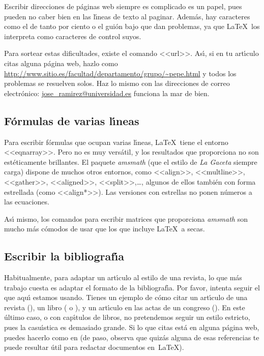 \documentclass[autocontact]{gaceta}
\begin{document}
Escribir direcciones de p\'aginas web siempre es complicado es un papel, pues pueden no caber bien en las l\'{\i}neas de texto al paginar. Adem\'as, hay caracteres como el de tanto por ciento o el gui\'on bajo que dan problemas, ya que \LaTeX\ los interpreta como caracteres de control suyos.

Para sortear estas dificultades, existe el comando <<url>>. As\'{\i}, si en tu art\'{\i}culo citas alguna p\'agina web, hazlo como
\url{http://www.sitio.es/facultad/departamento/grupo/~pepe.html}
y todos los problemas se resuelven solos. Haz lo mismo con las direcciones de correo electr\'onico: \url{jose_ramirez@universidad.es} funciona la mar de bien.


\subsection{F\'ormulas de varias l\'{\i}neas}

Para escribir f\'ormulas que ocupan varias l\'{\i}neas, \LaTeX\ tiene el entorno <<eqnarray>>. Pero no es muy vers\'atil, y los resultados que proporciona no son est\'eticamente brillantes. El paquete \textit{amsmath} (que el estilo de \textit{La Gaceta} siempre carga) dispone de muchos otros entornos, como <<align>>, <<multline>>, <<gather>>, <<aligned>>, <<split>>,\dots, algunos de ellos tambi\'en con forma estrellada (como <<align*>>). Las versiones con estrellas no ponen n\'umeros a las ecuaciones.

As\'{\i} mismo, los comandos para escribir matrices que proporciona \textit{amsmath} son mucho m\'as c\'omodos de usar que los que incluye \LaTeX\ a secas.

\subsection{Escribir la bibliograf\'{\i}a}

Habitualmente, para adaptar un art\'{\i}culo al estilo de una revista, lo que m\'as trabajo cuesta es adaptar el formato de la bibliograf\'{\i}a. 
Por favor, intenta seguir el que aqu\'{\i} estamos usando. Tienes un ejemplo de c\'omo citar un art\'{\i}culo de una revista (\cite{Kn}), un libro (\cite{latex-imprenta} o \cite{latex-companion}), y un art\'{\i}culo en las actas de un congreso (\cite{Tao-ICM}). En este \'ultimo caso, o con cap\'{\i}tulos de libros, no pretendemos seguir un estilo estricto, pues la casu\'{\i}stica es demasiado grande. Si lo que citas est\'a en alguna p\'agina web, puedes hacerlo como en \cite{Be-spanish, Be-orto, Do, MeSl} (de paso, observa que quiz\'as alguna de esas referencias te puede resultar \'util para redactar documentos en~\LaTeX).
\end{document}
